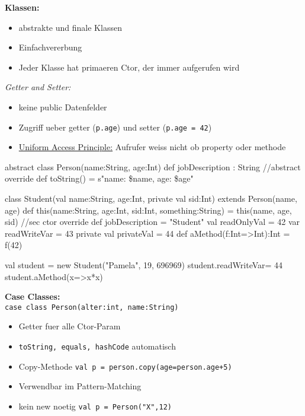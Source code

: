\begin{breakbox}
\textbf{Klassen:}
\begin{itemize}
	\item abstrakte und finale Klassen
	\item Einfachvererbung
	\item Jeder Klasse hat primaeren Ctor, der immer aufgerufen wird\\
\end{itemize}
\emph{Getter and Setter:}
\begin{itemize}
	\item keine public Datenfelder
	\item Zugriff ueber getter (\texttt{p.age}) und setter (\texttt{p.age = 42})
	\item \underline{Uniform Access Principle:} Aufrufer weiss nicht ob property oder methode
\end{itemize}
\begin{scalacode}
abstract class Person(name:String, age:Int) {
  def jobDescription : String //abstract
  override def toString() = s"name: \$name, age: \$age"
}

class Student(val name:String, age:Int, private val sid:Int) 
		extends Person(name, age) {
  def this(name:String, age:Int, sid:Int, something:String) 
  		= this(name, age, sid) //sec ctor
  override def jobDescription = "Student"
  val readOnlyVal = 42
  var readWriteVar = 43
  private val privateVal = 44
  def aMethod(f:Int=>Int):Int = {f(42)}
}

val student = new Student("Pamela", 19, 696969)
student.readWriteVar= 44
student.aMethod(x=>x*x)
\end{scalacode}
\end{breakbox}

\begin{breakbox}
\textbf{Case Classes:}\\
\texttt{case class Person(alter:int, name:String)}
\begin{itemize}
	\item Getter fuer alle Ctor-Param
	\item \texttt{toString, equals, hashCode} automatisch
	\item Copy-Methode \texttt{val p = person.copy(age=person.age+5)}
	\item Verwendbar im Pattern-Matching
	\item kein new noetig \texttt{val p = Person("X",12)}
\end{itemize}
\end{breakbox}

